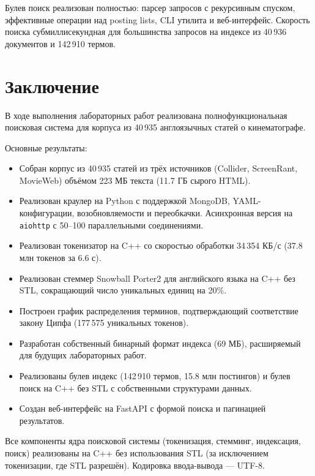 \documentclass[a4paper,12pt]{article}
\begin{document}
Булев поиск реализован полностью: парсер запросов с рекурсивным спуском, эффективные операции над posting lists, CLI утилита и веб-интерфейс. Скорость поиска субмиллисекундная для большинства запросов на индексе из 40\,936 документов и 142\,910 термов.


\newpage
\section*{Заключение}

В ходе выполнения лабораторных работ реализована полнофункциональная поисковая система для корпуса из 40\,935 англоязычных статей о кинематографе.

Основные результаты:

\begin{itemize}
    \item Собран корпус из 40\,935 статей из трёх источников (Collider, ScreenRant, MovieWeb) объёмом 223 МБ текста (11.7 ГБ сырого HTML).
    \item Реализован краулер на Python с поддержкой MongoDB, YAML-конфигурации, возобновляемости и переобкачки. Асинхронная версия на \texttt{aiohttp} с 50--100 параллельными соединениями.
    \item Реализован токенизатор на C++ со скоростью обработки 34\,354 КБ/с (37.8 млн токенов за 6.6 с).
    \item Реализован стеммер Snowball Porter2 для английского языка на C++ без STL, сокращающий число уникальных единиц на 20\%.
    \item Построен график распределения терминов, подтверждающий соответствие закону Ципфа (177\,575 уникальных токенов).
    \item Разработан собственный бинарный формат индекса (69 МБ), расширяемый для будущих лабораторных работ.
    \item Реализованы булев индекс (142\,910 термов, 15.8 млн постингов) и булев поиск на C++ без STL с собственными структурами данных.
    \item Создан веб-интерфейс на FastAPI с формой поиска и пагинацией результатов.
\end{itemize}

Все компоненты ядра поисковой системы (токенизация, стемминг, индексация, поиск) реализованы на C++ без использования STL (за исключением токенизации, где STL разрешён). Кодировка ввода-вывода --- UTF-8.
\end{document}
